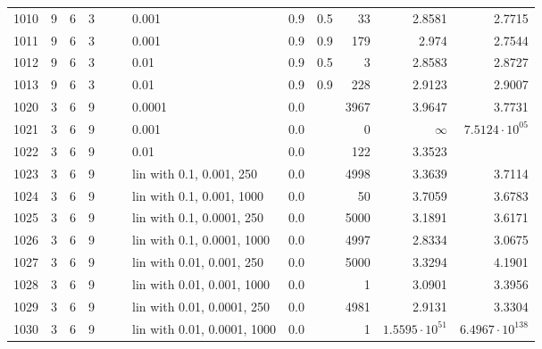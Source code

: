 \begin{longtable}{lrrrrrlrrrrr}
1010 &       9 & 6 & 3 &   &   &                       0.001 &  0.9 &    0.5 &      33 &                 2.8581 &                 2.7715 \\
1011 &       9 & 6 & 3 &   &   &                       0.001 &  0.9 &    0.9 &     179 &                  2.974 &                 2.7544 \\
1012 &       9 & 6 & 3 &   &   &                        0.01 &  0.9 &    0.5 &       3 &                 2.8583 &                 2.8727 \\
1013 &       9 & 6 & 3 &   &   &                        0.01 &  0.9 &    0.9 &     228 &                 2.9123 &                 2.9007 \\
1020 &       3 & 6 & 9 &   &   &                      0.0001 &  0.0 &        &    3967 &                 3.9647 &                 3.7731 \\
1021 &       3 & 6 & 9 &   &   &                       0.001 &  0.0 &        &       0 &               $\infty$ &  $7.5124\cdot 10^{05}$ \\
1022 &       3 & 6 & 9 &   &   &                        0.01 &  0.0 &        &     122 &                 3.3523 &                        \\
1023 &       3 & 6 & 9 &   &   &    lin with 0.1, 0.001, 250 &  0.0 &        &    4998 &                 3.3639 &                 3.7114 \\
1024 &       3 & 6 & 9 &   &   &   lin with 0.1, 0.001, 1000 &  0.0 &        &      50 &                 3.7059 &                 3.6783 \\
1025 &       3 & 6 & 9 &   &   &   lin with 0.1, 0.0001, 250 &  0.0 &        &    5000 &                 3.1891 &                 3.6171 \\
1026 &       3 & 6 & 9 &   &   &  lin with 0.1, 0.0001, 1000 &  0.0 &        &    4997 &                 2.8334 &                 3.0675 \\
1027 &       3 & 6 & 9 &   &   &   lin with 0.01, 0.001, 250 &  0.0 &        &    5000 &                 3.3294 &                 4.1901 \\
1028 &       3 & 6 & 9 &   &   &  lin with 0.01, 0.001, 1000 &  0.0 &        &       1 &                 3.0901 &                 3.3956 \\
1029 &       3 & 6 & 9 &   &   &  lin with 0.01, 0.0001, 250 &  0.0 &        &    4981 &                 2.9131 &                 3.3304 \\
1030 &       3 & 6 & 9 &   &   & lin with 0.01, 0.0001, 1000 &  0.0 &        &       1 &  $1.5595\cdot 10^{51}$ & $6.4967\cdot 10^{138}$ \\

\end{longtable}
